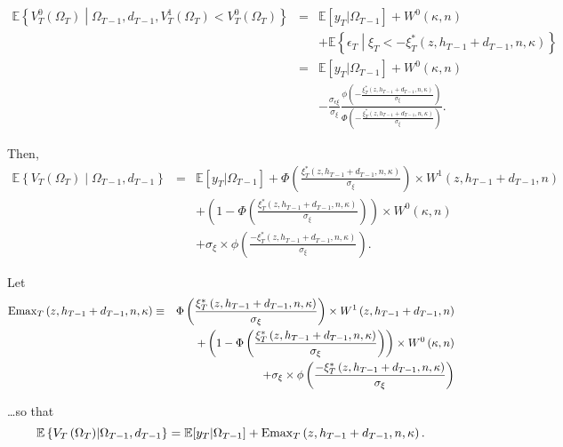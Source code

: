 \begin{eqnarray}
\mathbb{E} \left\{ V^{0}_T\left(\Omega_T\right) \middle| \Omega_{T-1}, d_{T-1}, V^{1}_T\left(\Omega_T\right) < V^{0}_T\left(\Omega_T\right) \right\}
&=& \mathbb{E} [y_T | \Omega_{T-1}] + W^0\left(\kappa, n\right) \nonumber \\
& & + \mathbb{E} \left\{\epsilon_T \middle| \xi_T < -\xi^*_T\left(z, h_{T-1} + d_{T-1}, n, \kappa \right) \right\} \nonumber \\
&=& \mathbb{E} [y_T | \Omega_{T-1}] + W^0\left(\kappa, n\right) \nonumber \\
& & - \frac{\sigma_{\epsilon \xi}}{\sigma_\xi} \frac{\phi\left(-\frac{\xi^*_T\left(z,h_{T-1}+d_{T-1},n,\kappa\right)}{\sigma_\xi}\right)}{\Phi\left(-\frac{\xi^*_T\left(z,h_{T-1}+d_{T-1},n,\kappa\right)}{\sigma_\xi}\right)}.
\end{eqnarray}

\indent Then, 
\begin{eqnarray}
\mathbb{E} \left\{ V_T\left(\Omega_T\right) \middle| \Omega_{T-1}, d_{T-1}\right\} &=& \mathbb{E} [y_T | \Omega_{T-1}] + \Phi\left( \frac{\xi^*_T\left(z,h_{T-1}+d_{T-1},n,\kappa\right)}{\sigma_\xi}\right) \times W^1\left( z,h_{T-1}+d_{T-1},n \right) \nonumber \\
& & + \left(1 - \Phi\left( \frac{\xi^*_T\left(z,h_{T-1}+d_{T-1},n,\kappa\right)}{\sigma_\xi}\right) \right) \times  W^0\left(\kappa, n\right) \nonumber \\
& & + \sigma_\xi \times \phi\left( \frac{- \xi^*_T\left(z,h_{T-1}+d_{T-1},n,\kappa\right)}{\sigma_\xi}\right).
\end{eqnarray}

\noindent Let 
\begin{eqnarray}
\Emax_T\left(z,h_{T-1}+d_{T-1},n,\kappa\right) &\equiv & \Phi\left( \frac{\xi^*_T\left(z,h_{T-1}+d_{T-1},n,\kappa\right)}{\sigma_\xi}\right) \times W^1\left( z,h_{T-1}+d_{T-1},n \right) \noindent \\
& & + \left(1 - \Phi\left( \frac{\xi^*_T\left(z,h_{T-1}+d_{T-1},n,\kappa\right)}{\sigma_\xi}\right) \right) \times  W^0\left(\kappa, n\right) \noindent \\
& & + \sigma_\xi \times \phi\left( \frac{- \xi^*_T\left(z,h_{T-1}+d_{T-1},n,\kappa\right)}{\sigma_\xi}\right) 
\end{eqnarray}

\noindent \ldots so that
\begin{equation*}
\mathbb{E} \left\{ V_T\left(\Omega_T\right) \middle| \Omega_{T-1}, d_{T-1}\right\} = \mathbb{E} [y_T | \Omega_{T-1}]  + \operatorname{Emax}_T\left(z,h_{T-1}+d_{T-1},n,\kappa\right).  
\end{equation*}

